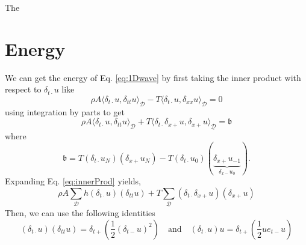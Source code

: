 \documentclass[dvipsnames]{article}
\begin{document}
The  


\section{Energy}
We can get the energy of Eq. \eqref{eq:1Dwave} by first taking the inner product with respect to $\delta_{t\cdot}u$ like
\begin{equation}
    \rho A\langle \delta_{t\cdot}u, \delta_{tt}u\rangle_\mathcal{D} - T \langle \delta_{t\cdot}u,\delta_{xx}u\rangle_\mathcal{D} = 0
\end{equation}
using integration by parts to get
\begin{equation}\label{eq:innerProd}
    \rho A\langle \delta_{t\cdot}u, \delta_{tt}u\rangle_\mathcal{D} + T \langle \delta_{t\cdot}\delta_{x+}u,\delta_{x+}u\rangle_{\underline{\mathcal{D}}} = \mathfrak{b}
\end{equation}
where
\begin{equation}
    \mathfrak{b} = T (\delta_{t\cdot}u_N)(\delta_{x+}u_N) - T(\delta_{t\cdot}u_0)(\underbrace{\delta_{x+}u_{-1}}_{\delta_{x-}u_0}).
\end{equation}
Expanding Eq. \eqref{eq:innerProd} yields,
\begin{equation}
    \rho A \sum_\mathcal{D}h(\delta_{t\cdot}u)(\delta_{tt}u) + T \sum_{\underline{\mathcal{D}}}(\delta_{t\cdot}\delta_{x+}u)(\delta_{x+}u)
\end{equation}
Then, we can use the following identities  
\begin{equation}
    (\delta_{t\cdot}u)(\delta_{tt}u) = \delta_{t+}\left(\frac{1}{2}(\delta_{t-}u)^2\right) \quad \text{and} \quad (\delta_{t\cdot}u)u = \delta_{t+}\left(\frac{1}{2}u e_{t-}u\right)
\end{equation}
\end{document}
